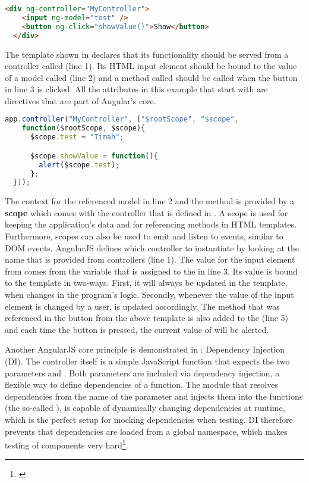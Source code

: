 \begin{lstlisting}[language=HTML, caption=A simple AngularJS template, label=lst:angular-template]
  <div ng-controller="MyController">
    <input ng-model="test" />
    <button ng-click="showValue()">Show</button>
  </div>
\end{lstlisting}

The template shown in  declares that its functionality should be served from a controller called  (line 1). Its HTML input element should be bound to the value of a model called  (line 2) and a method called  should be called when the button in line 3 is clicked. All the attributes in this example that start with  are directives that are part of Angular's core.

\begin{lstlisting}[language=JavaScript, caption=A simple AngularJS controller, label=lst:angular-controller]
  app.controller("MyController", ["$rootScope", "$scope",
    function($rootScope, $scope){
      $scope.test = "Timah";

      $scope.showValue = function(){
        alert($scope.test);
      };
  }]);
\end{lstlisting}

The context for the referenced model  in line 2 and the method  is provided by a \textbf{scope} which comes with the controller that is defined in . A scope is used for keeping the application's data and for referencing methods in HTML templates. Furthermore, scopes can also be used to emit and listen to events, similar to DOM events. AngularJS defines which controller to instantiate by looking at the name that is provided from controllers (line 1). The value for the input element from  comes from the variable that is assigned to the  in line 3. Its value is bound to the template in two-ways. First, it will always be updated in the template, when  changes in the program's logic. Secondly, whenever the value of the input element is changed by a user,  is updated accordingly. The method that was referenced in the button from the above template is also added to the  (line 5) and each time the button is pressed, the current value of  will be alerted.

Another AngularJS core principle is demonstrated in : Dependency Injection (DI). The controller itself is a simple JavaScript function that expects the two parameters  and . Both parameters are included via dependency injection, a flexible way to define dependencies of a function. The module that resolves dependencies from the name of the parameter and injects them into the functions (the so-called ), is capable of dynamically changing dependencies at runtime, which is the perfect setup for mocking dependencies when testing. DI therefore prevents that dependencies are loaded from a global namespace, which makes testing of components very hard\footnote{\cite[p. 149ff]{lerner2013ngbook}}.


